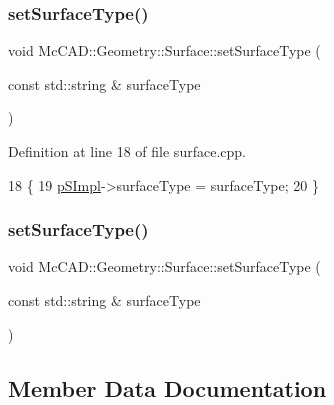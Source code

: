 \subsubsection{\texorpdfstring{set\+Surface\+Type()}{setSurfaceType()}\hspace{0.1cm}{\footnotesize\ttfamily [1/2]}}
{\footnotesize\ttfamily void Mc\+C\+A\+D\+::\+Geometry\+::\+Surface\+::set\+Surface\+Type (\begin{DoxyParamCaption}\item[{const std\+::string \&}]{surface\+Type }\end{DoxyParamCaption})}



Definition at line 18 of file surface.\+cpp.


\begin{DoxyCode}
18                                                                 \{
19   \hyperlink{classMcCAD_1_1Geometry_1_1Surface_a0097d4e9bfc1c7cd7cd33d81492b9100}{pSImpl}->surfaceType = surfaceType;
20 \}
\end{DoxyCode}
\mbox{\label{classMcCAD_1_1Geometry_1_1Surface_a976893834481e58569db0d35db2ba969}} 
\subsubsection{\texorpdfstring{set\+Surface\+Type()}{setSurfaceType()}\hspace{0.1cm}{\footnotesize\ttfamily [2/2]}}
{\footnotesize\ttfamily void Mc\+C\+A\+D\+::\+Geometry\+::\+Surface\+::set\+Surface\+Type (\begin{DoxyParamCaption}\item[{const std\+::string \&}]{surface\+Type }\end{DoxyParamCaption})}



\subsection{Member Data Documentation}
\mbox{\label{classMcCAD_1_1Geometry_1_1Surface_a0097d4e9bfc1c7cd7cd33d81492b9100}} 
